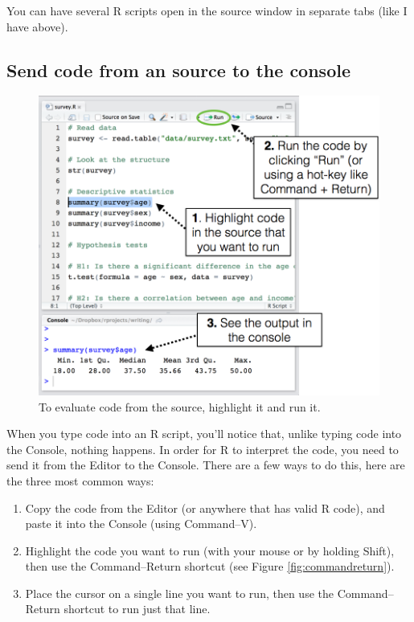 \documentclass[]{book}
\theoremstyle{definition}
\theoremstyle{definition}
\theoremstyle{remark}
\begin{document}
You can have several R scripts open in the source window in separate
tabs (like I have above).

\subsection{Send code from an source to the
console}\label{send-code-from-an-source-to-the-console}

\begin{figure}

{\centering \includegraphics[width=0.75\linewidth]{images/runningcode} 

}

\caption{To evaluate code from the source, highlight it and run it.}\label{fig:runcode}
\end{figure}

When you type code into an R script, you'll notice that, unlike typing
code into the Console, nothing happens. In order for R to interpret the
code, you need to send it from the Editor to the Console. There are a
few ways to do this, here are the three most common ways:

\begin{enumerate}
\def\labelenumi{\arabic{enumi}.}
\item
  Copy the code from the Editor (or anywhere that has valid R code), and
  paste it into the Console (using Command--V).
\item
  Highlight the code you want to run (with your mouse or by holding
  Shift), then use the Command--Return shortcut (see Figure
  \ref{fig:commandreturn}).
\item
  Place the cursor on a single line you want to run, then use the
  Command--Return shortcut to run just that line.
\end{enumerate}
\end{document}
